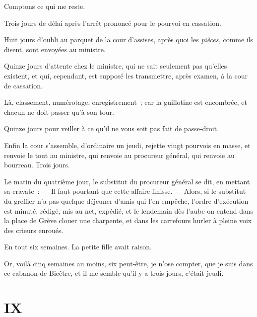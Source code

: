 \documentclass[french,twoside]{book} %
\begin{document}
\noindent Comptons ce qui me reste.\par
Trois jours de délai après l’arrêt prononcé pour le pourvoi en cassation.\par
Huit jours d’oubli au parquet de la cour d’assises, après quoi les \emph{pièces,} comme ils disent, sont envoyées au ministre.\par
Quinze jours d’attente chez le ministre, qui ne sait seulement pas qu’elles existent, et qui, cependant, est supposé les transmettre, après examen, à la cour de cassation.\par
Là, classement, numérotage, enregistrement ; car la guillotine est encombrée, et chacun ne doit passer qu’à son tour.\par
Quinze jours pour veiller à ce qu’il ne vous soit pas fait de passe-droit.\par
Enfin la cour s’assemble, d’ordinaire un jeudi, rejette vingt pourvois en masse, et renvoie le tout au ministre, qui renvoie au procureur général, qui renvoie au bourreau. Trois jours.\par
 Le matin du quatrième jour, le substitut du procureur général se dit, en mettant sa cravate : — Il faut pourtant que cette affaire finisse. — Alors, si le substitut du greffier n’a pas quelque déjeuner d’amis qui l’en empêche, l’ordre d’exécution est minuté, rédigé, mis au net, expédié, et le lendemain dès l’aube on entend dans la place de Grève clouer une charpente, et dans les carrefours hurler à pleine voix des crieurs enroués.\par
En tout six semaines. La petite fille avait raison.\par
Or, voilà cinq semaines au moins, six peut-être, je n’ose compter, que je suis dans ce cabanon de Bicêtre, et il me semble qu’il y a trois jours, c’était jeudi.
 \section[{IX}]{IX}
\label{ch9}\renewcommand{\leftmark}{IX}
\end{document}
